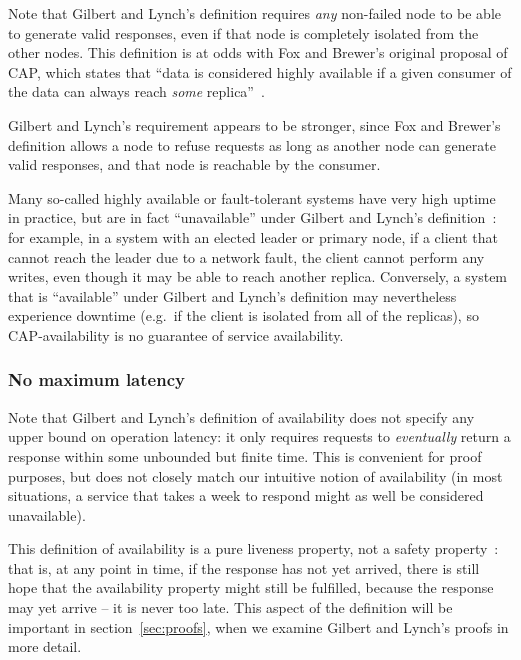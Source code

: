 \documentclass[a4paper,twocolumn,10pt]{article}
\begin{document}
Note that Gilbert and Lynch's definition requires \emph{any} non-failed node to be able to generate
valid responses, even if that node is completely isolated from the other nodes. This definition is
at odds with Fox and Brewer's original proposal of CAP, which states that ``data is considered
highly available if a given consumer of the data can always reach \emph{some}
replica''~\cite[emphasis original]{Fox1999bs}.

Gilbert and Lynch's requirement appears to be stronger, since Fox and Brewer's definition allows a
node to refuse requests as long as another node can generate valid responses, and that node is
reachable by the consumer.

Many so-called highly available or fault-tolerant systems have very high uptime in practice, but are
in fact ``unavailable'' under Gilbert and Lynch's definition~\cite{Kim1984bl}: for example, in a
system with an elected leader or primary node, if a client that cannot reach the leader due to a
network fault, the client cannot perform any writes, even though it may be able to reach another
replica. Conversely, a system that is ``available'' under Gilbert and Lynch's definition may
nevertheless experience downtime (e.g.\ if the client is isolated from all of the replicas), so
CAP-availability is no guarantee of service availability.

\subsubsection{No maximum latency}\label{sec:no-max-latency}

Note that Gilbert and Lynch's definition of availability does not specify any upper bound on
operation latency: it only requires requests to \emph{eventually} return a response within some
unbounded but finite time. This is convenient for proof purposes, but does not closely match our
intuitive notion of availability (in most situations, a service that takes a week to respond might
as well be considered unavailable).

This definition of availability is a pure liveness property, not a safety
property~\cite{Alpern1985dg}: that is, at any point in time, if the response has not yet arrived,
there is still hope that the availability property might still be fulfilled, because the response
may yet arrive -- it is never too late. This aspect of the definition will be important in
section~\ref{sec:proofs}, when we examine Gilbert and Lynch's proofs in more detail.
\end{document}
